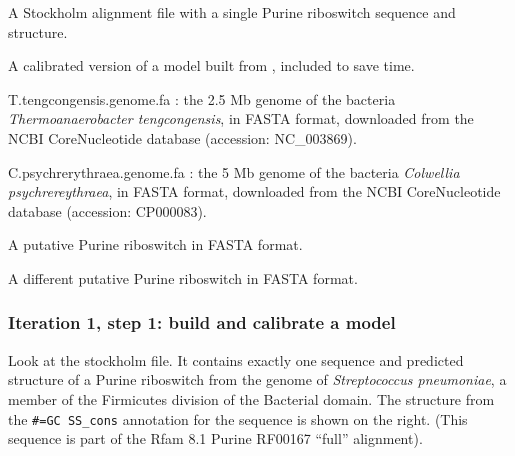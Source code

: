   \begin{sreitems}{}
  \item[\prog{purine.1.sto}] A Stockholm alignment file with a single
       Purine riboswitch sequence and structure. 
  \item[\prog{purine.1.c.cm}] A calibrated version of a model built
    from , included to save time.
  \item[T.tengcongensis.genome.fa]: the 2.5 Mb genome of the bacteria
    \emph{Thermoanaerobacter tengcongensis}, in
    FASTA format, downloaded from the NCBI CoreNucleotide database
    (accession: NC\_003869). 
  \item[C.psychrerythraea.genome.fa]: the 5 Mb genome of the bacteria
    \emph{Colwellia psychrereythraea}, in
    FASTA format, downloaded from the NCBI CoreNucleotide database
    (accession: CP000083). 
  \item[\prog{purine.teng.fa}] A putative Purine riboswitch in FASTA format.
  \item[\prog{purine.psych.fa}] A different putative Purine riboswitch in FASTA format.
  \end{sreitems}

\subsubsection{Iteration 1, step 1: build and calibrate a model}

Look at the  stockholm file. It contains exactly
one sequence and predicted structure of a Purine riboswitch from the
genome of \emph{Streptococcus pneumoniae}, a member of the Firmicutes
division of the Bacterial domain. The structure from the
{\small\verb+#=GC SS_cons+}
annotation for the sequence is shown on the right. 
(This sequence is part of the Rfam 8.1 Purine RF00167 ``full''
alignment). 

